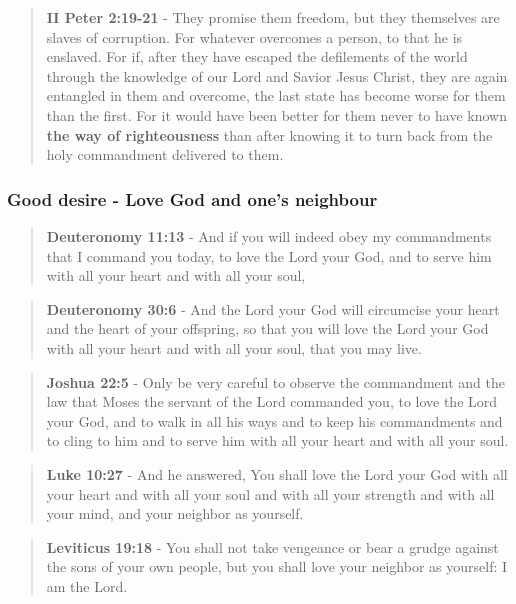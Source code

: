 \documentclass[11pt]{article}
\begin{document}
\begin{quote}
\textbf{II Peter 2:19-21} - They promise them freedom, but they themselves are slaves of corruption. For whatever overcomes a person, to that he is enslaved. For if, after they have escaped the defilements of the world through the knowledge of our Lord and Savior Jesus Christ, they are again entangled in them and overcome, the last state has become worse for them than the first. For it would have been better for them never to have known \textbf{the way of righteousness} than after knowing it to turn back from the holy commandment delivered to them.
\end{quote}

\subsubsection{Good desire - Love God and one's neighbour}
\label{sec:org5956a1e}
\begin{quote}
\textbf{Deuteronomy 11:13} - And if you will indeed obey my commandments that I command you today, to love the Lord your God, and to serve him with all your heart and with all your soul,
\end{quote}

\begin{quote}
\textbf{Deuteronomy 30:6} - And the Lord your God will circumcise your heart and the heart of your offspring, so that you will love the Lord your God with all your heart and with all your soul, that you may live.
\end{quote}

\begin{quote}
\textbf{Joshua 22:5} - Only be very careful to observe the commandment and the law that Moses the servant of the Lord commanded you, to love the Lord your God, and to walk in all his ways and to keep his commandments and to cling to him and to serve him with all your heart and with all your soul.
\end{quote}

\begin{quote}
\textbf{Luke 10:27} - And he answered, You shall love the Lord your God with all your heart and with all your soul and with all your strength and with all your mind, and your neighbor as yourself.
\end{quote}

\begin{quote}
\textbf{Leviticus 19:18} - You shall not take vengeance or bear a grudge against the sons of your own people, but you shall love your neighbor as yourself: I am the Lord.
\end{quote}
\end{document}
